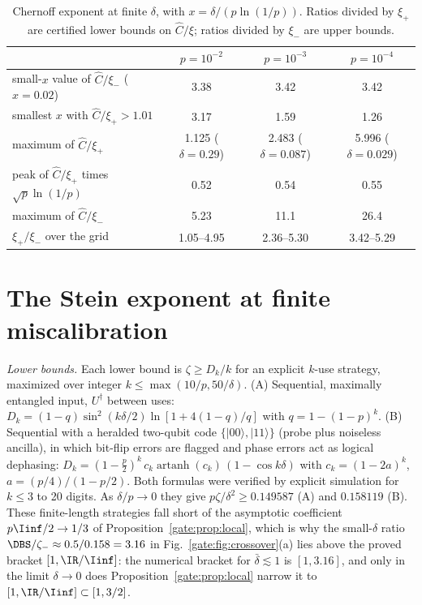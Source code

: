 \begin{table}[!tbp]
\centering
\caption{Chernoff exponent at finite $\delta$, with $x=\delta/(p\ln(1/p))$. Ratios divided by $\xi_+$ are certified lower bounds on $\hat C/\xi$; ratios divided by $\xi_-$ are upper bounds.}
\label{gate:tab:m1cross}
\small
\begin{tabular}{lccc}
\toprule
 & $p=10^{-2}$ & $p=10^{-3}$ & $p=10^{-4}$\\
\midrule
small-$x$ value of $\hat C/\xi_-$ ($x=0.02$) & 3.38 & 3.42 & 3.42\\
smallest $x$ with $\hat C/\xi_+>1.01$ & 3.17 & 1.59 & 1.26\\
maximum of $\hat C/\xi_+$ & 1.125 ($\delta=0.29$) & 2.483 ($\delta=0.087$) & 5.996 ($\delta=0.029$)\\
peak of $\hat C/\xi_+$ times $\sqrt p\ln(1/p)$ & 0.52 & 0.54 & 0.55\\
maximum of $\hat C/\xi_-$ & 5.23 & 11.1 & 26.4\\
$\xi_+/\xi_-$ over the grid & 1.05--4.95 & 2.36--5.30 & 3.42--5.29\\
\bottomrule
\end{tabular}
\end{table}

\section{The Stein exponent at finite miscalibration}\label{gate:sec:finite}

\emph{Lower bounds.} Each lower bound is $\zeta\ge D_k/k$ for an explicit $k$-use strategy, maximized over integer $k\le\max(10/p,50/\delta)$. (A) Sequential, maximally entangled input, $U^\dagger$ between uses: $D_k=(1-q)\sin^2(k\delta/2)\ln[1+4(1-q)/q]$ with $q=1-(1-p)^k$. (B) Sequential with a heralded two-qubit code $\{|00\rangle,|11\rangle\}$ (probe plus noiseless ancilla), in which bit-flip errors are flagged and phase errors act as logical dephasing: $D_k=(1-\frac p2)^k\,c_k\operatorname{artanh}(c_k)\,(1-\cos k\delta)$ with $c_k=(1-2a)^k$, $a=(p/4)/(1-p/2)$. Both formulas were verified by explicit simulation for $k\le3$ to 20 digits. As $\delta/p\to0$ they give $p\zeta/\delta^2\ge0.149587$ (A) and $0.158119$ (B). These finite-length strategies fall short of the asymptotic coefficient $p\Iinf/2\to1/3$ of Proposition~\ref{gate:prop:local}, which is why the small-$\delta$ ratio $\DBS/\zeta_-\approx0.5/0.158=3.16$ in Fig.~\ref{gate:fig:crossover}(a) lies above the proved bracket $[1,\IR/\Iinf]$: the numerical bracket for $\bar\delta\lesssim1$ is $[1,3.16]$, and only in the limit $\delta\to0$ does Proposition~\ref{gate:prop:local} narrow it to $[1,\IR/\Iinf]\subset[1,3/2]$.

